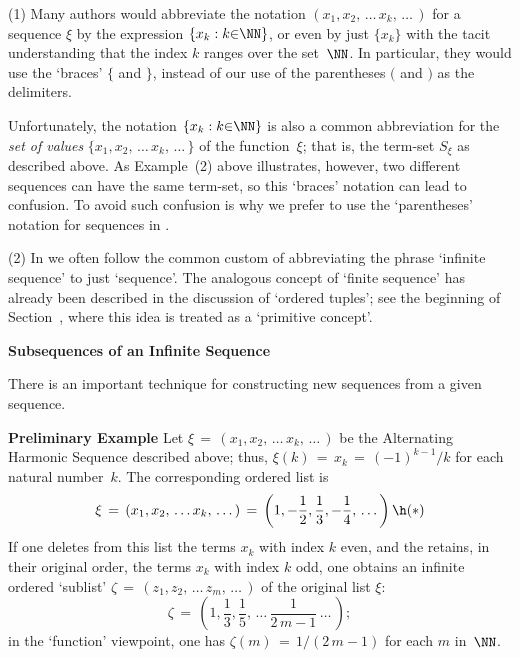 \V

        (1) Many authors would abbreviate the notation $(x_{1}, x_{2}, \,{\ldots}\,x_{k},\,{\ldots}\,)$
    for a sequence ${\xi}$ by the expression $\{x_{k}: k{\in}{\NN}\}$, or even by just $\{x_{k}\}$ with the tacit understanding that the index $k$ ranges over the set~${\NN}$.
    In particular, they would use the `braces' $\{$ and $\}$, instead of our use of the parentheses $($ and $)$ as the delimiters.

    Unfortunately, the notation $\{x_{k}: k{\in}{\NN}\}$ is also a common abbreviation for the {\em set of values} $\{x_{1}, x_{2},\,{\ldots}\,x_{k}, \,{\ldots}\,\}$
    of the function~${\xi}$; that is, the term-set $S_{{\xi}}$ as described above. As Example~(2) above illustrates, however,
    two different sequences can have the same term-set, so this `braces' notation can lead to confusion.
    To avoid such confusion is why we prefer to use the `parentheses' notation for sequences in {\ThisText}.

\V

        (2) In {\ThisText} we often follow the common custom of abbreviating the phrase `infinite sequence' to just `sequence'.
    The analogous concept of `finite sequence' has already been described in the discussion of `ordered tuples';
    see the beginning of Section~, where this idea is treated as a `primitive concept'.

\VV

        {\bf Subsequences of an Infinite Sequence}

\V
\V

        There is an important technique for constructing new sequences from a given sequence.

\V

        {\bf Preliminary Example} Let ${\xi} \,=\, (x_{1}, x_{2},\,{\ldots}\, x_{k},\,{\ldots}\,)$ be the Alternating Harmonic Sequence described above;
    thus, ${\xi}(k) \,=\, x_{k} \,=\, (-1)^{k-1}/k$ for each natural number~$k$. The corresponding ordered list is
        \begin{displaymath}
        {\xi} \,=\, 
        (x_{1}, x_{2},\,{\ldots}\,x_{k},\,{\ldots}\,)
    \,=\,
        \left(1, -\frac{1}{2}, \frac{1}{3}, -\frac{1}{4},\,{\ldots}\,\right)
    \h ({\ast})
        \end{displaymath} 
    If one deletes from this list the terms $x_{k}$ with index $k$ even, and the retains, in their original order, the terms $x_{k}$ with index $k$ odd,
    one obtains an infinite ordered `sublist' ${\zeta} \,=\, (z_{1}, z_{2},\,{\ldots}\,z_{m},\,{\ldots}\,)$ of the original list ${\xi}$:
        \begin{displaymath}
        {\zeta} \,=\, \left(1, \frac{1}{3}, \frac{1}{5}, \,{\ldots}\,\frac{1}{2\,m-1}\,{\ldots}\,\right);
        \end{displaymath}
    in the `function' viewpoint, one has ${\zeta}(m) \,=\, 1/(2\,m-1)$ for each $m$ in~${\NN}$.

